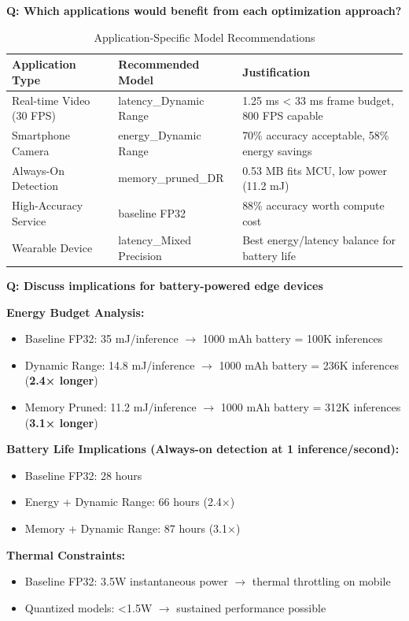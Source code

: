 \documentclass[10pt, a4paper]{article}
\begin{document}
\textbf{Q: Which applications would benefit from each optimization approach?}

\begin{table}[H]
\centering
\footnotesize
\begin{tabular}{|p{3.5cm}|p{4cm}|p{5.5cm}|}
\hline
\textbf{Application Type} & \textbf{Recommended Model} & \textbf{Justification} \\
\hline
Real-time Video (30 FPS) & latency\_Dynamic Range & 1.25 ms < 33 ms frame budget, 800 FPS capable \\
\hline
Smartphone Camera & energy\_Dynamic Range & 70\% accuracy acceptable, 58\% energy savings \\
\hline
Always-On Detection & memory\_pruned\_DR & 0.53 MB fits MCU, low power (11.2 mJ) \\
\hline
High-Accuracy Service & baseline FP32 & 88\% accuracy worth compute cost \\
\hline
Wearable Device & latency\_Mixed Precision & Best energy/latency balance for battery life \\
\hline
\end{tabular}
\caption{Application-Specific Model Recommendations}
\end{table}

\textbf{Q: Discuss implications for battery-powered edge devices}

\textbf{Energy Budget Analysis:}
\begin{itemize}
    \item Baseline FP32: 35 mJ/inference $\rightarrow$ 1000 mAh battery = 100K inferences
    \item Dynamic Range: 14.8 mJ/inference $\rightarrow$ 1000 mAh battery = 236K inferences (\textbf{2.4× longer})
    \item Memory Pruned: 11.2 mJ/inference $\rightarrow$ 1000 mAh battery = 312K inferences (\textbf{3.1× longer})
\end{itemize}

\textbf{Battery Life Implications (Always-on detection at 1 inference/second):}
\begin{itemize}
    \item Baseline FP32: 28 hours
    \item Energy + Dynamic Range: 66 hours (2.4×)
    \item Memory + Dynamic Range: 87 hours (3.1×)
\end{itemize}

\textbf{Thermal Constraints:}
\begin{itemize}
    \item Baseline FP32: 3.5W instantaneous power $\rightarrow$ thermal throttling on mobile
    \item Quantized models: <1.5W $\rightarrow$ sustained performance possible
\end{itemize}
\end{document}
